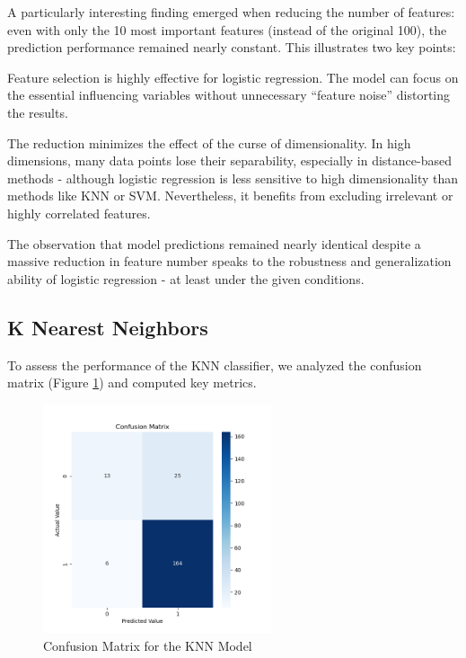 \documentclass{article}
\begin{document}
A particularly interesting finding emerged when reducing the number of features: even with only the 10 most important features (instead of the original 100), the prediction performance remained nearly constant. This illustrates two key points:

Feature selection is highly effective for logistic regression. The model can focus on the essential influencing variables without unnecessary “feature noise” distorting the results.

The reduction minimizes the effect of the curse of dimensionality. In high dimensions, many data points lose their separability, especially in distance-based methods - although logistic regression is less sensitive to high dimensionality than methods like KNN or SVM. Nevertheless, it benefits from excluding irrelevant or highly correlated features.

The observation that model predictions remained nearly identical despite a massive reduction in feature number speaks to the robustness and generalization ability of logistic regression - at least under the given conditions.

\citep{hosmer2013logistic}

\subsection{K Nearest Neighbors}

To assess the performance of the KNN classifier, we analyzed the confusion matrix (Figure \ref{fig:confusion_matrix_KNN}) and computed key metrics.

\begin{figure}[h]
  \centering
  \includegraphics[width=0.6\textwidth]{confusion_matrix_KNN.png}
  \caption{Confusion Matrix for the KNN Model}
  \label{fig:confusion_matrix_KNN}
\end{figure}
\end{document}
